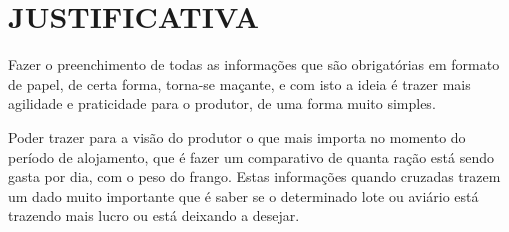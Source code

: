 
\chapter{JUSTIFICATIVA}
\label{chap:justificativa}

Fazer o preenchimento de todas as informações que são obrigatórias em formato de papel, de certa forma, torna-se maçante, e com isto a ideia é trazer mais agilidade e praticidade para o produtor, de uma forma muito simples. 

Poder trazer para a visão do produtor o que mais importa no momento do período de alojamento, que é fazer um comparativo de quanta ração está sendo gasta por dia, com o peso do frango. Estas informações quando cruzadas trazem um dado muito importante que é saber se o determinado lote ou aviário está trazendo mais lucro ou está deixando a desejar.
